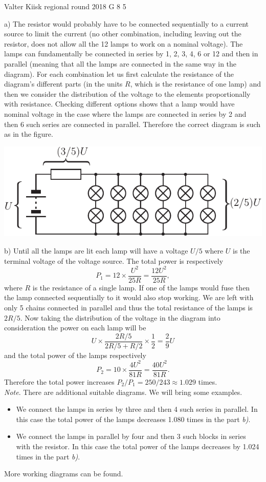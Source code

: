 \documentclass[11pt]{article}
\begin{document}
{Valter Kiisk} %
{regional round} %
{2018} %
{G 8} %
{5} %
{

\ifEngSolution
a) The resistor would probably have to be connected sequentially to a current source to limit the current (no other combination, including leaving out the resistor, does not allow all the 12 lamps to work on a nominal voltage). The lamps can fundamentally be connected in series by 1, 2, 3, 4, 6 or 12 and then in parallel (meaning that all the lamps are connected in the same way in the diagram). For each combination let us first calculate the resistance of the diagram’s different parts (in the units $R$, which is the resistance of one lamp) and then we consider the distribution of the voltage to the elements proportionally with resistance. Checking different options shows that a lamp would have nominal voltage in the case where the lamps are connected in series by 2 and then 6 such series are connected in parallel. Therefore the correct diagram is such as in the figure.
\begin{center}
\includegraphics{2018-v2g-08-lambid-joonis}
\end{center}
b) Until all the lamps are lit each lamp will have a voltage $U/5$ where $U$ is the terminal voltage of the voltage source. The total power is respectively
\[
P_1=12\times \frac{U^2}{25R}=\frac{12U^2}{25R},
\] 
where $R$ is the resistance of a single lamp. If one of the lamps would fuse then the lamp connected sequentially to it would also stop working. We are left with only 5 chains connected in parallel and thus the total resistance of the lamps is $2R/5$. Now taking the distribution of the voltage in the diagram into consideration the power on each lamp will be
\[
U\times \frac{2R/5}{2R/5+R/2} \times \frac{1}{2}=\frac{2}{9}U
\] 
and the total power of the lamps respectively
\[
P_2=10\times \frac{4U^2}{81R}=\frac{40U^2}{81R}.
\] 
Therefore the total power increases $P_2/P_1=250/243\approx \num{1.029}$ times.\\
\emph{Note}. There are additional suitable diagrams. We will bring some examples.\\
\begin{itemize}
\item We connect the lamps in series by three and then 4 such series in parallel. In this case the total power of the lamps decreases 1.080 times in the part \emph{b)}.
\item We connect the lamps in parallel by four and then 3 such blocks in series with the resistor. In this case the total power of the lamps decreases by 1.024 times in the part \emph{b)}.
\end{itemize}
More working diagrams can be found.
\fi
}
\end{document}

